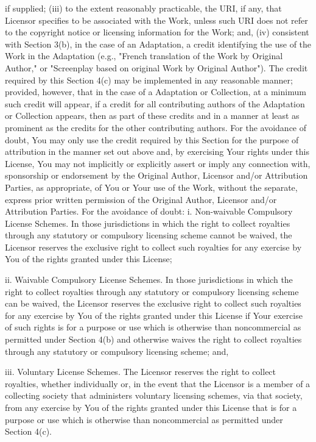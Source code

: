 \documentclass[oneside]{book}
\begin{document}
if supplied; (iii) to the extent reasonably practicable, the URI, if any, that
Licensor specifies to be associated with the Work, unless such URI does not
refer to the copyright notice or licensing information for the Work; and, (iv)
consistent with Section 3(b), in the case of an Adaptation, a credit identifying
the use of the Work in the Adaptation (e.g., "French translation of the Work by
Original Author," or "Screenplay based on original Work by Original
Author"). The credit required by this Section 4(c) may be implemented in any
reasonable manner; provided, however, that in the case of a Adaptation or
Collection, at a minimum such credit will appear, if a credit for all
contributing authors of the Adaptation or Collection appears, then as part of
these credits and in a manner at least as prominent as the credits for the other
contributing authors. For the avoidance of doubt, You may only use the credit
required by this Section for the purpose of attribution in the manner set out
above and, by exercising Your rights under this License, You may not implicitly
or explicitly assert or imply any connection with, sponsorship or endorsement by
the Original Author, Licensor and/or Attribution Parties, as appropriate, of You
or Your use of the Work, without the separate, express prior written permission
of the Original Author, Licensor and/or Attribution Parties.  For the avoidance
of doubt: i.  Non-waivable Compulsory License Schemes. In those jurisdictions in
which the right to collect royalties through any statutory or compulsory
licensing scheme cannot be waived, the Licensor reserves the exclusive right to
collect such royalties for any exercise by You of the rights granted under this
License;

ii.  Waivable Compulsory License Schemes. In those jurisdictions in which the
right to collect royalties through any statutory or compulsory licensing scheme
can be waived, the Licensor reserves the exclusive right to collect such
royalties for any exercise by You of the rights granted under this License if
Your exercise of such rights is for a purpose or use which is otherwise than
noncommercial as permitted under Section 4(b) and otherwise waives the right to
collect royalties through any statutory or compulsory licensing scheme; and,

iii.  Voluntary License Schemes. The Licensor reserves the right to collect
royalties, whether individually or, in the event that the Licensor is a member
of a collecting society that administers voluntary licensing schemes, via that
society, from any exercise by You of the rights granted under this License that
is for a purpose or use which is otherwise than noncommercial as permitted under
Section 4(c).
\end{document}
